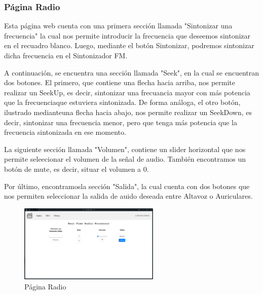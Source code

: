\subsubsection{Página Radio}
Esta página web cuenta con una primera sección llamada "Sintonizar una frecuencia" la cual nos permite introducir la frecuencia que deseemos sintonizar en el recuadro blanco. Luego, mediante el botón Sintonizar, podremos sintonizar dicha frecuencia en el Sintonizador FM.

A continuación, se encuentra una sección llamada "Seek", en la cual se encuentran dos botones. El primero, que contiene una flecha hacia arriba, nos permite realizar un SeekUp, es decir, sintonizar una frecuancia mayor con más potencia que la frecuenciaque estuviera sintonizada. De forma análoga, el otro botón, ilustrado medianteuna flecha hacia abajo, nos permite realizar un SeekDown, es decir, sintonizar una frecuencia menor, pero que tenga más potencia que la frecuencia sintonizada en ese momento.

La siguiente sección llamada "Volumen", contiene un slider horizontal que nos permite seleecionar el volumen de la señal de audio. También encontramos un botón de mute, es decir, situar el volumen a 0.

Por último, encontramosla sección "Salida", la cual cuenta con dos botones que nos permiten seleccionar la salida de auido deseada entre Altavoz o Auriculares.

\begin{figure}[h]
    \centering
    \includegraphics[width=0.6\textwidth]{images/3/3-1/3-1-1-2/Pagina_Radio.png}
    \caption{Página Radio}
    \label{fig:3-1-1-2-Radio}
\end{figure}